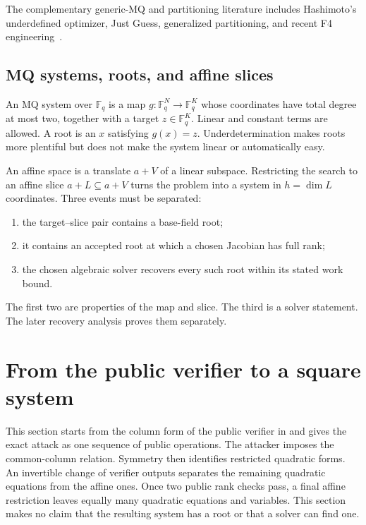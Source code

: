 \documentclass[11pt]{article}
\newcommand{\F}{\mathbb F}
\begin{document}
The complementary generic-MQ and partitioning literature includes
Hashimoto's underdefined optimizer, Just Guess, generalized partitioning, and
recent F4 engineering~\cite{Hashimoto2023,MayOstuzziRessler2026,AsanumaEtAl2026,SakataTakagi2026}.

\subsection{MQ systems, roots, and affine slices}
An MQ system over $\F_q$ is a map $g:\F_q^N\to\F_q^K$ whose coordinates
have total degree at most two, together with a target $z\in\F_q^K$.  Linear
and constant terms are allowed.  A root is an $x$ satisfying $g(x)=z$.
Underdetermination makes roots more plentiful but does not make the system
linear or automatically easy.

An affine space is a translate $a+V$ of a linear subspace.  Restricting the
search to an affine slice $a+L\subseteq a+V$ turns the problem into a system
in $h=\dim L$ coordinates.  Three events must be separated:
\begin{enumerate}[label=(\roman*)]
\item the target--slice pair contains a base-field root;
\item it contains an accepted root at which a chosen Jacobian has full rank;
\item the chosen algebraic solver recovers every such root within its stated
      work bound.
\end{enumerate}
The first two are properties of the map and slice.  The third is a solver
statement.  The later recovery analysis proves them separately.

\section{From the public verifier to a square system}
\label{sec:public-symmetry}\label{sec:affine-reduction}

This section starts from the column form of the public verifier in
 and gives the exact attack
as one sequence of public operations.  The attacker imposes the common-column
relation.  Symmetry then identifies restricted quadratic forms.  An invertible
change of verifier outputs separates the remaining quadratic equations from
the affine ones.  Once two public rank checks pass, a final affine restriction
leaves equally many quadratic equations and variables.  This section makes no
claim that the resulting system has a root or that a solver can find one.
\end{document}

